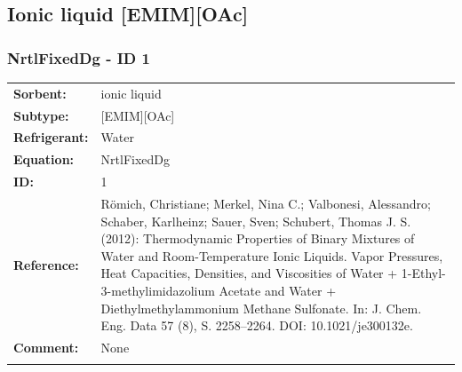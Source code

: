 \subsection{Ionic liquid [EMIM][OAc]}
%
\subsubsection{NrtlFixedDg - ID 1}
%
\begin{tabular}[l]{|lp{11.5cm}|}
\hline
\addlinespace

\textbf{Sorbent:} & ionic liquid \\
\textbf{Subtype:} & [EMIM][OAc] \\
\textbf{Refrigerant:} & Water \\
\textbf{Equation:} & NrtlFixedDg \\
\textbf{ID:} & 1 \\
\textbf{Reference:} & Römich, Christiane; Merkel, Nina C.; Valbonesi, Alessandro; Schaber, Karlheinz; Sauer, Sven; Schubert, Thomas J. S. (2012): Thermodynamic Properties of Binary Mixtures of Water and Room-Temperature Ionic Liquids. Vapor Pressures, Heat Capacities, Densities, and Viscosities of Water + 1-Ethyl-3-methylimidazolium Acetate and Water + Diethylmethylammonium Methane Sulfonate. In: J. Chem. Eng. Data 57 (8), S. 2258–2264. DOI: 10.1021/je300132e. \\
\textbf{Comment:} & None \\

\addlinespace
\hline
\end{tabular}
\newline

